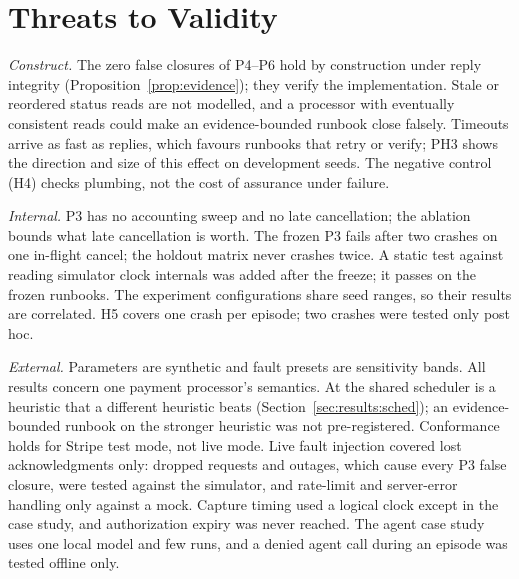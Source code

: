 \section{Threats to Validity}\label{sec:threats}

\emph{Construct.} The zero false closures of P4--P6 hold by construction under reply integrity (Proposition~\ref{prop:evidence}); they verify the implementation. Stale or reordered status reads are not modelled, and a processor with eventually consistent reads could make an evidence-bounded runbook close falsely. Timeouts arrive as fast as replies, which favours runbooks that retry or verify; PH3 shows the direction and size of this effect on development seeds. The negative control (H4) checks plumbing, not the cost of assurance under failure.

\emph{Internal.} P3 has no accounting sweep and no late cancellation; the ablation bounds what late cancellation is worth. The frozen P3 fails after two crashes on one in-flight cancel; the holdout matrix never crashes twice. A static test against reading simulator clock internals was added after the freeze; it passes on the frozen runbooks. The experiment configurations share seed ranges, so their results are correlated. H5 covers one crash per episode; two crashes were tested only post hoc.

\emph{External.} Parameters are synthetic and fault presets are sensitivity bands. All results concern one payment processor's semantics. At  the shared scheduler is a heuristic that a different heuristic beats (Section~\ref{sec:results:sched}); an evidence-bounded runbook on the stronger heuristic was not pre-registered. Conformance holds for Stripe test mode, not live mode. Live fault injection covered lost acknowledgments only: dropped requests and outages, which cause every P3 false closure, were tested against the simulator, and rate-limit and server-error handling only against a mock. Capture timing used a logical clock except in the case study, and authorization expiry was never reached. The agent case study uses one local model and few runs, and a denied agent call during an episode was tested offline only.
